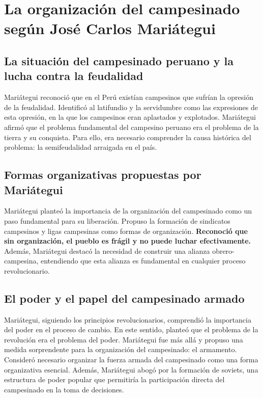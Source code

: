 \documentclass[
  jou,
  floatsintext,
  longtable,
  a4paper,
  nolmodern,
  notxfonts,
  notimes,
  12pt,
  colorlinks=true,linkcolor=blue,citecolor=blue,urlcolor=blue]{apa7}
\begin{document}
\section{La organización del campesinado según José Carlos
Mariátegui}\label{la-organizaciuxf3n-del-campesinado-seguxfan-josuxe9-carlos-mariuxe1tegui}

\subsection{La situación del campesinado peruano y la lucha contra la
feudalidad}\label{la-situaciuxf3n-del-campesinado-peruano-y-la-lucha-contra-la-feudalidad}

Mariátegui reconoció que en el Perú existían campesinos que sufrían la
opresión de la feudalidad. Identificó al latifundio y la servidumbre
como las expresiones de esta opresión, en la que los campesinos eran
aplastados y explotados. Mariátegui afirmó que el problema fundamental
del campesino peruano era el problema de la tierra y su conquista. Para
ello, era necesario comprender la causa histórica del problema: la
semifeudalidad arraigada en el país.

\subsection{Formas organizativas propuestas por
Mariátegui}\label{formas-organizativas-propuestas-por-mariuxe1tegui}

Mariátegui planteó la importancia de la organización del campesinado
como un paso fundamental para su liberación. Propuso la formación de
sindicatos campesinos y ligas campesinas como formas de organización.
\textbf{Reconoció que sin organización, el pueblo es frágil y no puede
luchar efectivamente.} Además, Mariátegui destacó la necesidad de
construir una alianza obrero-campesina, entendiendo que esta alianza es
fundamental en cualquier proceso revolucionario.

\subsection{El poder y el papel del campesinado
armado}\label{el-poder-y-el-papel-del-campesinado-armado}

Mariátegui, siguiendo los principios revolucionarios, comprendió la
importancia del poder en el proceso de cambio. En este sentido, planteó
que el problema de la revolución era el problema del poder. Mariátegui
fue más allá y propuso una medida sorprendente para la organización del
campesinado: el armamento. Consideró necesario organizar la fuerza
armada del campesinado como una forma organizativa esencial. Además,
Mariátegui abogó por la formación de soviets, una estructura de poder
popular que permitiría la participación directa del campesinado en la
toma de decisiones.
\end{document}
